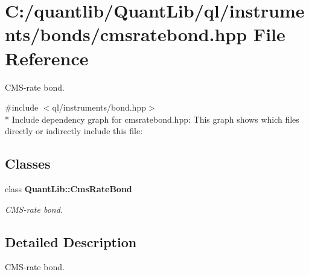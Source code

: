 \section{C\+:/quantlib/\+Quant\+Lib/ql/instruments/bonds/cmsratebond.hpp File Reference}
\label{cmsratebond_8hpp}


C\+M\+S-\/rate bond.  


{\ttfamily \#include $<$ql/instruments/bond.\+hpp$>$}\\*
Include dependency graph for cmsratebond.\+hpp\+:
This graph shows which files directly or indirectly include this file\+:
\subsection*{Classes}
\begin{DoxyCompactItemize}
\item 
class {\bf Quant\+Lib\+::\+Cms\+Rate\+Bond}
\begin{DoxyCompactList}\small\item\em C\+M\+S-\/rate bond. \end{DoxyCompactList}\end{DoxyCompactItemize}


\subsection{Detailed Description}
C\+M\+S-\/rate bond. 

